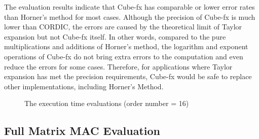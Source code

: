 The evaluation results indicate that Cube-fx has comparable or lower error rates than Horner's method for most cases. Although the precision of Cube-fx is much lower than CORDIC, the errors are caused by the theoretical limit of Taylor expansion but not Cube-fx itself. In other words, compared to the pure multiplications and additions of Horner's method, the logarithm and exponent operations of Cube-fx do not bring extra errors to the computation and even reduce the errors for some cases. Therefore, for applications where Taylor expansion has met the precision requirements, Cube-fx would be safe to replace other implementations, including Horner's Method.

\begin{figure}[tb]
  \caption{The execution time evaluations (order number = 16)}
  \label{fig:compare}
  \end{figure}

\subsection{Full Matrix MAC Evaluation \label{Sec: 4.2}}

